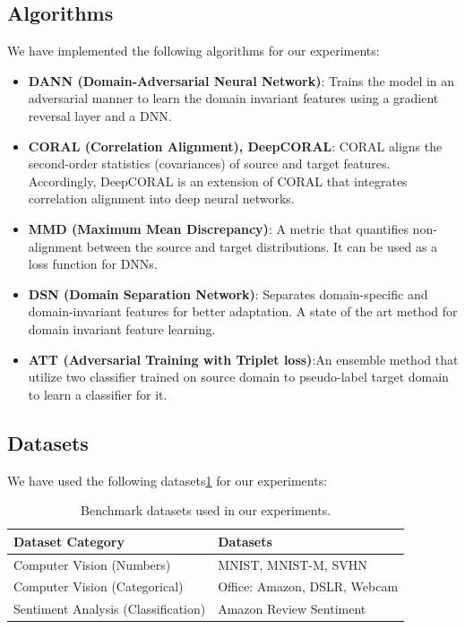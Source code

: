 \documentclass{article}
\begin{document}
\subsection{Algorithms}
We have implemented the following algorithms for our experiments:
\begin{itemize}
  \item \textbf{DANN (Domain-Adversarial Neural Network)}\cite{ganin2016domainadversarialtrainingneuralnetworks}: Trains the model in an adversarial manner to learn the domain invariant features using a gradient reversal layer and a DNN.
  \item \textbf{CORAL (Correlation Alignment), DeepCORAL}\cite{Coral,DeepCoral}: CORAL aligns the second-order statistics (covariances) of source and target features. Accordingly, DeepCORAL is an extension of CORAL that integrates correlation alignment into deep neural networks.
  \item \textbf{MMD (Maximum Mean Discrepancy)}\cite{sutherland2017generative}: A metric that quantifies non-alignment between the source and target distributions. It can be used as a loss function for DNNs.
  \item \textbf{DSN (Domain Separation Network)}\cite{DSN}: Separates domain-specific and domain-invariant features for better adaptation. A state of the art method for domain invariant feature learning.
  \item \textbf{ATT (Adversarial Training with Triplet loss)}\cite{pmlr-v70-saito17a}:An ensemble method that utilize two classifier trained on source domain to pseudo-label target domain to learn a classifier for it.
\end{itemize}

\subsection{Datasets}
We have used the following datasets\ref{tab:datasets} for our experiments:
\begin{table}
  \centering
  \caption{Benchmark datasets used in our experiments.}
  \label{tab:datasets}
  \begin{tabular}{ll}
      \toprule
      \textbf{Dataset Category} & \textbf{Datasets} \\
      \midrule
      Computer Vision (Numbers)     & MNIST, MNIST-M, SVHN \\
      Computer Vision (Categorical) & Office: Amazon, DSLR, Webcam \\
      Sentiment Analysis (Classification)  & Amazon Review Sentiment \\
      \bottomrule
  \end{tabular}
\end{table}
\end{document}
